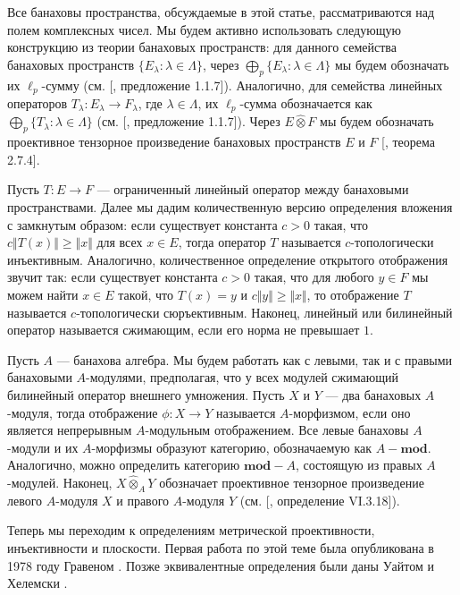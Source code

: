\documentclass[12pt]{article}
\newcommand{\projtens}{\mathbin{\widehat{\otimes}}}
\newcommand{\projmodtens}[1]{\mathbin{\widehat{\otimes}}_{#1}}
\begin{document}
Все банаховы пространства, обсуждаемые в этой статье, рассматриваются над полем
комплексных чисел. Мы будем активно использовать следующую конструкцию из 
теории банаховых пространств: для данного семейства банаховых 
пространств $\{E_\lambda: \lambda\in\Lambda\}$, 
через $\bigoplus_p\{E_\lambda: \lambda\in\Lambda\}$ мы будем обозначать 
их $\ell_p$-сумму (см. [\cite{HelLectAndExOnFuncAn}, предложение 1.1.7]). 
Аналогично, для семейства линейных операторов $T_\lambda:E_\lambda\to F_\lambda$, 
где $\lambda\in\Lambda$, их $\ell_p$-сумма обозначается 
как $\bigoplus_p\{T_\lambda:\lambda\in\Lambda\}$ 
(см. [\cite{HelLectAndExOnFuncAn}, предложение 1.1.7]). Через $E\projtens F$ мы 
будем обозначать проективное тензорное произведение 
банаховых пространств $E$ и $F$ [\cite{HelLectAndExOnFuncAn}, теорема 2.7.4].

Пусть $T:E\to F$ --- ограниченный линейный оператор между банаховыми 
пространствами. Далее мы дадим количественную версию определения 
вложения с замкнутым образом: если существует константа $c>0$ такая, 
что $c\Vert T(x)\Vert\geq \Vert x\Vert$ для всех $x\in E$, тогда оператор $T$ 
называется $c$-топологически инъективным. Аналогично, 
количественное определение открытого отображения звучит так: если существует 
константа $c>0$ такая, что для любого $y\in F$ мы можем найти $x\in E$ такой, 
что $T(x)=y$ и $c\Vert y\Vert\geq \Vert x\Vert$, то отображение $T$ 
называется $c$-топологически сюръективным. Наконец, линейный или билинейный
оператор называется сжимающим, если его норма не превышает $1$.

Пусть $A$ --- банахова алгебра. Мы будем работать как с левыми, так и с 
правыми банаховыми $A$-модулями, предполагая, что у всех модулей сжимающий 
билинейный оператор внешнего умножения. Пусть 
$X$ и $Y$ --- два банаховых $A$-модуля, тогда отображение $\phi:X\to Y$ называется 
$A$-морфизмом, если оно является непрерывным $A$-модульным отображением. Все 
левые банаховы $A$-модули и их $A$-морфизмы образуют категорию, обозначаемую 
как $A-\mathbf{mod}$. Аналогично, можно определить категорию $\mathbf{mod}-A$, 
состоящую из правых $A$-модулей. Наконец, $X\projmodtens{A} Y$ обозначает 
проективное тензорное произведение левого $A$-модуля $X$ и 
правого $A$-модуля $Y$ (см. [\cite{HelBanLocConvAlg}, определение VI.3.18]).

Теперь мы переходим к определениям метрической проективности, инъективности 
и плоскости. Первая работа по этой теме была опубликована в 1978 году 
Гравеном \cite{GravInjProjBanMod}. Позже эквивалентные определения были даны 
Уайтом \cite{WhiteInjmoduAlg} и Хелемски \cite{HelMetrFrQMod,HelMetrFlatNorMod}.
\end{document}

